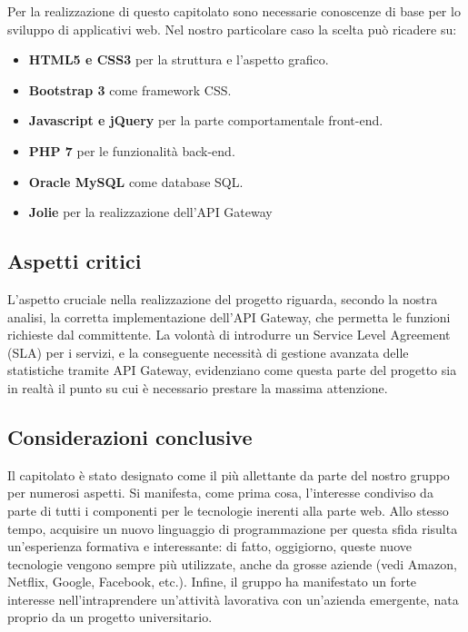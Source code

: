 Per la realizzazione di questo capitolato sono necessarie conoscenze
di base per lo sviluppo di applicativi web. Nel nostro particolare
caso la scelta può ricadere su:
\begin{itemize}
	\item \textbf{HTML5 e CSS3} per la struttura e l'aspetto grafico.
	\item \textbf{Bootstrap 3} come framework CSS.
	\item \textbf{Javascript e jQuery} per la parte comportamentale front-end.
	\item \textbf{PHP 7} per le funzionalità back-end.
	\item \textbf{Oracle MySQL} come database SQL.
	\item \textbf{Jolie} per la realizzazione dell'API Gateway
\end{itemize}

\subsection{Aspetti critici}

L'aspetto cruciale nella realizzazione del progetto riguarda, secondo la nostra analisi, la corretta implementazione dell'API Gateway, che permetta le funzioni
richieste dal committente. La volontà di introdurre un Service Level
Agreement (SLA) per i servizi, e la conseguente necessità di gestione
avanzata delle statistiche tramite API Gateway, evidenziano come questa
parte del progetto sia in realtà il punto su cui è necessario prestare la massima attenzione.

\subsection{Considerazioni conclusive}

Il capitolato è stato designato come il più allettante da parte del
nostro gruppo per numerosi aspetti. Si manifesta, come prima cosa,
l'interesse condiviso da parte di tutti i componenti per le tecnologie
inerenti alla parte web. Allo stesso tempo, acquisire un nuovo linguaggio
di programmazione per questa sfida risulta un'esperienza
formativa e interessante: di fatto, oggigiorno, queste nuove tecnologie vengono sempre più utilizzate, anche da grosse aziende (vedi Amazon, Netflix, Google, Facebook, etc.). Infine, il gruppo ha manifestato un forte interesse nell'intraprendere un'attività lavorativa con un'azienda emergente, nata proprio da un progetto universitario.